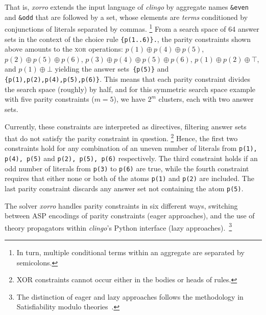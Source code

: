 \documentclass{article}
\newcommand{\XOR}{\textsc{xor}} %
\newcommand{\sysfont}{\textit}
\newcommand{\clingo}{\sysfont{clingo}}
\newcommand{\xorro}{\sysfont{xorro}}
\newcommand{\xor}{\oplus}
\newcommand{\set}[1]{\{#1\}}
\begin{document}
%
That is, \xorro{} extends the input language of \clingo{} by
aggregate names \texttt{\&even} and \texttt{\&odd} that are followed
by a set, whose elements are \emph{terms} conditioned by
conjunctions of literals separated by commas.%
%
\footnote{In turn, multiple conditional terms within an aggregate are
	separated by semicolons.}
%
From a search space of 64 answer sets in the context of the choice rule \texttt{\set{p(1..6)}.}, the parity constraints shown above
amounts to the \XOR{} operations:
$p(1) \xor p(4) \xor p(5)$, $p(2) \xor p(5) \xor p(6)$, $p(3) \xor p(4) \xor p(5) \xor p(6)$, $p(1) \xor p(2) \xor \top$, and $p(1) \xor \bot$
yielding the answer sets~\texttt{\set{p(5)}} and \texttt{\set{p(1),p(2),p(4),p(5),p(6)}}.
This means that each parity constraint divides the search space (roughly) by half, and for this symmetric search space example with five parity constraints ($m=5$),
we have $2^m$ clusters, each with two answer sets.


Currently, these constraints are interpreted as directives,
filtering answer sets that do not satisfy the parity constraint in question.
\footnote{XOR constraints cannot occur either in the bodies or heads of rules.}
%
Hence, the first two
constraints hold for any combination of an uneven number of literals from \texttt{p(1), p(4), p(5)} and \texttt{p(2), p(5), p(6)} respectively.
The third constraint holds if an odd number of literals from \texttt{p(3)} to \texttt{p(6)} are true, while the fourth constraint requires that either none or both of
the atoms \texttt{p(1)} and \texttt{p(2)} are included.
The last parity constraint discards any answer set not containing the atom \texttt{p(5)}.

The solver \xorro{} handles parity constraints in six different ways,
switching between ASP encodings of parity constraints (eager approaches), and the use of theory propagators within \clingo{}'s Python interface (lazy approaches).~\footnote{The distinction of eager and lazy approaches follows the methodology in Satisfiability modulo theories~\cite{baseseti09a}.}
\end{document}
